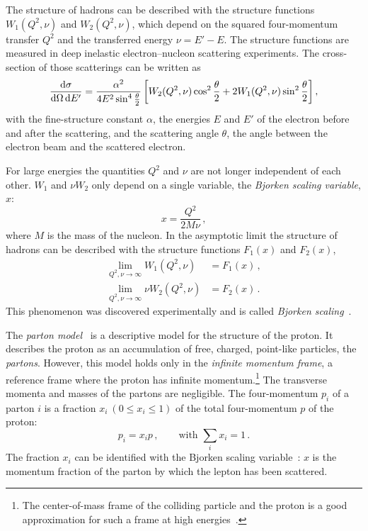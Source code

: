 The structure of hadrons can be described with the structure functions $W_1(Q^2, \nu)$ and $W_2(Q^2, \nu)$,
which depend on the squared four-momentum transfer $Q^2$ and the transferred energy $\nu = E' - E$.
The structure functions are measured in deep inelastic electron--nucleon scattering experiments.
The cross-section of those scatterings can be written as~\cite{drell64, bjo:scaling}
\begin{equation}
    \frac{\dif \sigma}{\dif\Omega \dif E'} = \frac{\alpha^2}{4 E^2 \sin^4 \frac{\theta}{2}}
    \left[ W_2(Q^2, \nu) \cos^2 \frac{\theta}{2} + 2 W_1(Q^2, \nu) \sin^2 \frac{\theta}{2} \right ],
\end{equation}
with the fine-structure constant $\alpha$, the energies $E$ and $E'$ of the electron before and after the scattering,
and the scattering angle $\theta$, the angle between the electron beam and the scattered electron.

For large energies the quantities $Q^2$ and $\nu$ are not longer independent of each other.
$W_1$ and $\nu W_2$ only depend on a single variable, the \emph{Bjorken scaling variable}, $x$:
\begin{equation}
    x = \frac{Q^2}{2 M \nu} \,,
\end{equation}
where $M$ is the mass of the nucleon.
In the asymptotic limit the structure of hadrons can be described with the structure functions $F_1(x)$ and $F_2(x)$,
\begin{equation}
    \begin{split}
        \lim_{Q^2, \nu \to \infty} W_1(Q^2, \nu) &= F_1(x) \,, \\
        \lim_{Q^2, \nu \to \infty} \nu W_2(Q^2, \nu) &= F_2(x) \,.
    \end{split}
\end{equation}
This phenomenon was discovered experimentally and is called \emph{Bjorken scaling}~\cite{bjo:scaling}.

The \emph{parton model}~\cite{feyn69,bjo:epscattering} is a descriptive model for the structure of the proton.
It describes the proton as an accumulation of free, charged, point-like particles, the \emph{partons}.
However, this model holds only in the \emph{infinite momentum frame}, a reference frame where the proton has infinite
momentum.\footnote{The center-of-mass frame of the colliding particle and the proton is a good approximation
for such a frame at high energies~\cite{bjo:epscattering}.}
The transverse momenta and masses of the partons are negligible.
The four-momentum $p_i$ of a parton $i$ is a fraction $x_i \ (0 \leq x_i \leq 1)$ of the total four-momentum $p$ of the proton:
\begin{equation}
    p_i = x_i p\,, \qquad\text{with } \sum_i x_i = 1\,.
\end{equation}
The fraction $x_i$ can be identified with the Bjorken scaling variable~\cite{bjo:epscattering}: $x$ is the momentum fraction of the parton
by which the lepton has been scattered.

